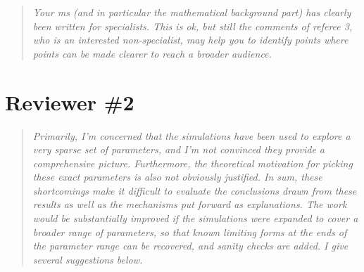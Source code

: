 \documentclass[11pt]{article}
\newenvironment{reviewerquote}{\begin{quote}\color{black}\itshape}{\end{quote}}
\begin{document}
\begin{reviewerquote}
Your ms (and in particular the mathematical background part) has clearly been written for specialists. This is ok, but still the comments of referee 3, who is an interested non-specialist, may help you to identify points where points can be made clearer to reach a broader audience.
\end{reviewerquote}


\section*{Reviewer \#2}

\begin{reviewerquote}
Primarily, I’m concerned that the simulations have been used to explore a very sparse set of parameters, and I’m not convinced they provide a comprehensive picture. Furthermore, the theoretical motivation for picking these exact parameters is also not obviously justified. In sum, these shortcomings make it difficult to evaluate the conclusions drawn from these results as well as the mechanisms put forward as explanations. The work would be substantially improved if the simulations were expanded to cover a broader range of parameters, so that known limiting forms at the ends of the parameter range can be recovered, and sanity checks are added. I give several suggestions below.
\end{reviewerquote}
\end{document}
